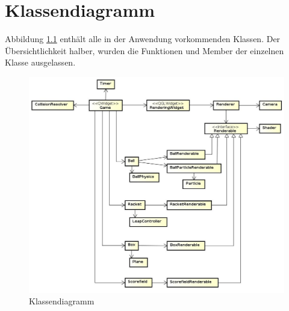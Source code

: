 
\chapter{Klassendiagramm}
\label{anhangA}
%
Abbildung \ref{fig:classDiagram} enthält alle in der Anwendung vorkommenden Klassen. Der Übersichtlichkeit halber, wurden die Funktionen und Member der einzelnen Klasse ausgelassen. 

\begin{figure}[h]
\centering
\includegraphics[width=0.9\linewidth]{bilder/classDiagram}
\caption{Klassendiagramm}
\label{fig:classDiagram}
\end{figure}


